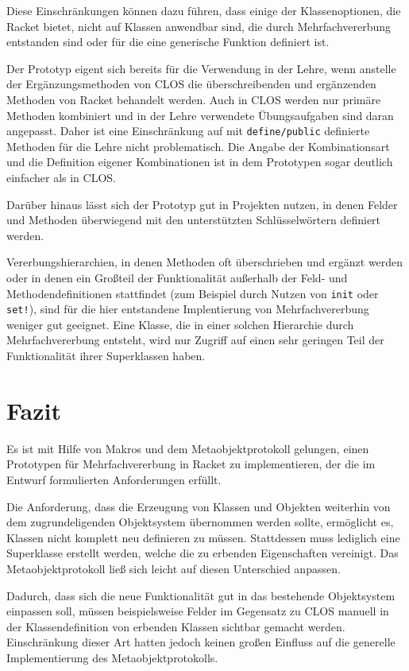 Diese Einschränkungen können dazu führen, dass einige der Klassenoptionen, die Racket bietet, nicht auf Klassen anwendbar sind, die durch Mehrfachvererbung entstanden sind oder für die eine generische Funktion definiert ist.

Der Prototyp eigent sich bereits für die Verwendung in der Lehre, wenn anstelle der Ergänzungsmethoden von CLOS die überschreibenden und ergänzenden Methoden von Racket behandelt werden. Auch in CLOS werden nur primäre Methoden kombiniert und in der Lehre verwendete Übungsaufgaben sind daran angepasst. Daher ist eine Einschränkung auf mit \texttt{define/public} definierte Methoden für die Lehre nicht problematisch. Die Angabe der Kombinationsart und die Definition eigener Kombinationen ist in dem Prototypen sogar deutlich einfacher als in CLOS.

Darüber hinaus lässt sich der Prototyp gut in Projekten nutzen, in denen Felder und Methoden überwiegend mit den unterstützten Schlüsselwörtern definiert werden. 

Vererbungshierarchien, in denen Methoden oft überschrieben und ergänzt werden oder in denen ein Großteil der Funktionalität außerhalb der Feld- und Methodendefinitionen stattfindet (zum Beispiel durch Nutzen von \texttt{init} oder \texttt{set!}), sind für die hier entstandene Implentierung von Mehrfachvererbung weniger gut geeignet. Eine Klasse, die in einer solchen Hierarchie durch Mehrfachvererbung entsteht, wird nur Zugriff auf einen sehr geringen Teil der Funktionalität ihrer Superklassen haben.

\section{Fazit}
Es ist mit Hilfe von Makros und dem Metaobjektprotokoll gelungen, einen Prototypen für Mehrfachvererbung in Racket zu implementieren, der die im Entwurf formulierten Anforderungen erfüllt.

Die Anforderung, dass die Erzeugung von Klassen und Objekten weiterhin von dem zugrundeligenden Objektsystem übernommen werden sollte, ermöglicht es, Klassen nicht komplett neu definieren zu müssen. Stattdessen muss lediglich eine Superklasse erstellt werden, welche die zu erbenden Eigenschaften vereinigt. Das Metaobjektprotokoll ließ sich leicht auf diesen Unterschied anpassen.

Dadurch, dass sich die neue Funktionalität gut in das bestehende Objektsystem einpassen soll, müssen beispielsweise Felder im Gegensatz zu CLOS manuell in der Klassendefinition von erbenden Klassen sichtbar gemacht werden. Einschränkung dieser Art hatten jedoch keinen großen Einfluss auf die generelle Implementierung des Metaobjektprotokolls.

